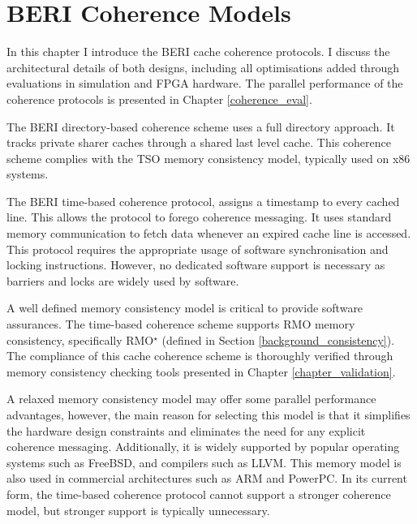 \makeatletter
\makeatother
\ifpdf
\graphicspath{{Chapter1/Chapter1Figs/PNG/}{Chapter1/Chapter1Figs/PDF/}{Chapter1/Chapter1Figs/}}
\else
\graphicspath{{Chapter1/Chapter1Figs/EPS/}{Chapter1/Chapter1Figs/}}
\fi

\chapter{BERI Coherence Models}
\label{chapter_coherence}

In this chapter I introduce the BERI cache coherence protocols. I discuss the architectural details of both designs, including all optimisations added through evaluations in simulation and FPGA hardware. The parallel performance of the coherence protocols is presented in Chapter \ref{coherence_eval}.

The BERI directory-based coherence scheme uses a full directory approach. It tracks private sharer caches through a shared last level cache. This coherence scheme complies with the TSO memory consistency model, typically used on x86 systems.

The BERI time-based coherence protocol, assigns a timestamp to every cached line. This allows the protocol to forego coherence messaging. It uses standard memory communication to fetch data whenever an expired cache line is accessed. This protocol requires the appropriate usage of software synchronisation and locking instructions. 
However, no dedicated software support is necessary as barriers and locks are widely used by software.

A well defined memory consistency model is critical to provide software assurances. The time-based coherence scheme supports RMO memory consistency, specifically RMO{\large$^\star$} (defined in Section \ref{background_consistency}). The compliance of this cache coherence scheme is thoroughly verified through memory consistency checking tools presented in Chapter \ref{chapter_validation}. 

A relaxed memory consistency model may offer some parallel performance advantages, however, the main reason for selecting this model is that it simplifies the hardware design constraints and eliminates the need for any explicit coherence messaging. Additionally, it is widely supported by popular operating systems such as FreeBSD, and compilers such as LLVM. This memory model is also used in commercial architectures such as ARM and PowerPC. In its current form, the time-based coherence protocol cannot support a stronger coherence model, but stronger support is typically unnecessary.


